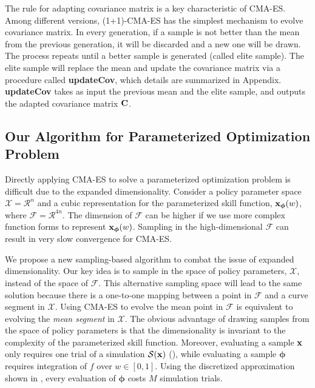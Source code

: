 The rule for adapting covariance matrix is a key characteristic of
CMA-ES.  Among different versions, (1+1)-CMA-ES \cite{Igel:2006:CEG}
has the simplest mechanism to evolve covariance matrix. In every
generation, if a sample is not better than the mean from the previous
generation, it will be discarded and a new one will be drawn. The
process repeats until a better sample is generated (called elite
sample). The elite sample will replace the mean and update the
covariance matrix via a procedure called \textbf{updateCov}, which
details are summarized in Appendix. \textbf{updateCov} takes as
input the previous mean and the elite sample, and outputs the adapted
covariance matrix $\mathbf{C}$. 
 

\subsection{Our Algorithm for Parameterized Optimization Problem}
\label{sec:optskills_our_algorithm}

Directly applying CMA-ES to solve a parameterized optimization problem
is difficult due to the expanded dimensionality. Consider a policy
parameter space $\mathcal{X} = \mathcal{R}^n$ and a cubic
representation for the parameterized skill function,
$\mathbf{x}_{\boldsymbol{\phi}}(w)$, where $\mathcal{F} =
\mathcal{R}^{4n}$. The dimension of $\mathcal{F}$ can be higher if we
use more complex function forms to represent
$\mathbf{x}_{\boldsymbol{\phi}}(w)$. Sampling in the high-dimensional
$\mathcal{F}$ can result in very slow convergence for CMA-ES.

We propose a new sampling-based algorithm to combat the issue of
expanded dimensionality. Our key idea is to sample in the space of
policy parameters, $\mathcal{X}$, instead of the space of
$\mathcal{F}$. This alternative sampling space will lead to the same solution
because there is a one-to-one mapping between a point in $\mathcal{F}$
and a curve segment in $\mathcal{X}$. Using CMA-ES to evolve the
mean point in $\mathcal{F}$ is equivalent to evolving the \emph{mean
  segment} in $\mathcal{X}$.  The obvious advantage of drawing
samples from the space of policy parameters is that the dimensionality
is invariant to the complexity of the parameterized skill
function. Moreover, evaluating a sample $\mathbf{x}$ only requires one
trial of a simulation $\mathcal{S}(\mathbf{x})$ (), while evaluating a sample $\boldsymbol{\phi}$ requires
integration of $f$ over $w \in [0,1]$.  Using the discretized
approximation shown in , every evaluation of
$\boldsymbol{\phi}$ costs $M$ simulation trials.
 
